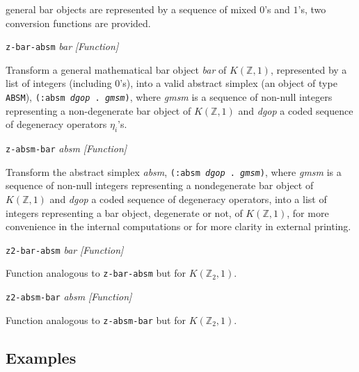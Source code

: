 {{general bar objects are represented by a sequence of mixed $0$'s and $1$'s, two conversion functions are
provided. \par}
{\leftskip=5mm
{\tt z-bar-absm} {\em bar}  \hfill {\em [Function]} \par}
{\leftskip=15mm
Transform a general mathematical bar object {\em bar} of $K(\mathbb{Z}, 1)$,
represented by a list of integers (including $0$'s),
into a valid abstract simplex (an object of type {\tt ABSM}), {\tt (:absm {\em dgop} . {\em gmsm})},
where {\em gmsm}  is a sequence of non-null integers representing a non-de\-ge\-ne\-ra\-te bar object of
$K(\mathbb{Z},1)$ and {\em dgop} a coded sequence of degeneracy operators $\eta_i$'s. \par}
{\leftskip=5mm
{\tt z-absm-bar} {\em absm}  \hfill {\em [Function]} \par}
{\leftskip=15mm
Transform the abstract simplex {\em absm},  {\tt (:absm {\em dgop} . {\em gmsm})}, where
{\em gmsm} is a sequence of non-null integers representing a nondegenerate bar object of
$K(\mathbb{Z},1)$ and {\em dgop} a coded sequence of degeneracy operators, into a list of integers
representing a bar object, degenerate or not, of $K(\mathbb{Z},1)$, for more convenience in the
internal computations or for more clarity in external printing. \par}
{\leftskip=5mm
{\tt z2-bar-absm} {\em bar}  \hfill {\em [Function]} \par}
{\leftskip=15mm
Function analogous to {\tt z-bar-absm} but for  $K(\mathbb{Z}_2, 1)$. \par}
{\leftskip=5mm
{\tt z2-absm-bar} {\em absm}  \hfill {\em [Function]} \par}
{\leftskip=15mm
Function analogous to {\tt z-absm-bar} but for  $K(\mathbb{Z}_2, 1)$. \par}
}

\subsection* {Examples}

